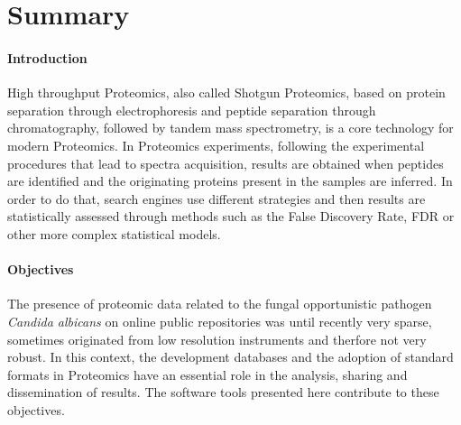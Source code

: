 %
%
%
%
%

\chapter{Summary}




\subsubsection*{Introduction}
High throughput Proteomics, also called Shotgun Proteomics,
based on protein separation through 
electrophoresis and peptide separation through chromatography, followed
by tandem mass spectrometry, is a core technology for modern Proteomics.
In Proteomics experiments, following the experimental procedures that
lead to spectra acquisition, results are obtained when peptides are 
identified and the originating proteins present in the samples are inferred.
In order to do that, search engines use different strategies and then
results are statistically assessed through methods such as the False
Discovery Rate, FDR or other more complex statistical models.

\subsubsection*{Objectives}
The presence of proteomic data related to the fungal opportunistic 
pathogen \textit{Candida albicans} on online public repositories was
until recently very sparse, sometimes originated from low resolution
instruments and therfore not very robust.
In this context, the development databases and the adoption
of standard formats in Proteomics have an essential role in the analysis,
sharing and dissemination of results. The software tools presented here 
contribute to these objectives.

